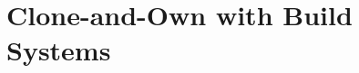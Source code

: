 

\lessonslearned{
	\item \ldots
}{
	\item \ldots
}{
	\ldots
}

\sectionend

\section{Clone-and-Own with Build Systems}



\lessonslearned{
	\item \ldots
}{
	\item \ldots
}{
	\ldots
}





